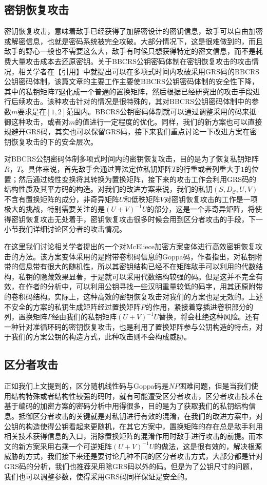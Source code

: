 \subsection{密钥恢复攻击}
密钥恢复攻击，意味着敌手已经获得了加解密设计的密钥信息，敌手可以自由加密或解密信息，也就是密码系统被完全攻破。大部分情况下，这是很难做到的，而且敌手的野心一般也不需要这么大，敌手有时候只想获得特定的密文信息，而不是耗费大量攻击成本去还原密钥。关于BBCRS公钥密码体制在密钥恢复攻击的攻击情况，相关学者在【引用】中就提出可以在多项式时间内攻破采用GRS码的BBCRS公钥密码体制，该篇文章的主要工作主要使BBCRS公钥密码体制的安全性下降，其中的私钥矩阵$T$退化成一个普通的置换矩阵，然后根据已经研究出的攻击手段进行后续攻击。该种攻击针对的情况是很特殊的，其对BBCRS公钥密码体制中的参数$m$要求是在$[1, 2]$范围内。BBCRS公钥密码体制就可以通过调整采用的码来抵御这种攻击，或者对$m$的值进行一定程度的优化。同样，我们的新方案也可以直接规避开GRS码，其实也可以保留GRS码，接下来我们重点讨论一下改进方案在密钥恢复攻击的下的安全层次。

对BBCRS公钥密码体制多项式时间内的密钥恢复攻击，目的是为了恢复私钥矩阵$R$，$T$。具体来说，首先敌手会通过算法定位私钥矩阵$T$的行重或者列重大于$1$的位置；然后通过线性变换将其转换为置换矩阵，接下来的攻击工作会利用GRS码的结构性质及其平方码的构造。对我们的改进方案来说，我们的私钥$(S,D_\mathcal{C},U,V)$不含有置换矩阵的成分，非奇异矩阵$U$和低秩矩阵$V$对密钥恢复攻击的工作是一项极大的挑战，特别需要关注的是$(U+V)^{-1}U$的部分，这是一个非奇异矩阵，将使得密钥恢复攻击无处着手，密钥恢复攻击很多时候会用到区分者攻击的手段，下一小节我们详细讨论区分者的攻击情况。

在这里我们讨论相关学者提出的一个对McEliece加密方案变体进行高效密钥恢复攻击的方法。该方案变体采用的是附带卷积码信息的Goppa码，作者指出，对私钥附带的信息带有很大的随机性，所以其密钥结构已经不在矩阵敌手可以利用的代数结构，私钥的隐藏效果显著，于是就可以采用代数结构较强的码。但是这并不完全有效，在作者的分析中，可以利用公钥寻找一些汉明重量较低的码字，用其还原附带的卷积码结构。实际上，这种高效的密钥恢复攻击对我们的方案也是无效的。上述不安全的方案的私钥生成矩阵经过置换矩阵$P$的作用，紧接着穿插进卷积部分的列，置换矩阵$P$经由我们的私钥矩阵$(U+V)^{-1}U$替换，将会杜绝这种风险。还有一种针对准循环码的密钥恢复攻击，也是利用了置换矩阵参与公钥构造的特点，对于我们的方案公钥的构造方式，此种攻击则不会构成威胁。

\subsection{区分者攻击}
正如我们上文提到的，区分随机线性码与Goppa码是$NP$困难问题，但是当我们使用结构特殊或者结构性较强的码时，就有可能遭受区分者攻击，区分者攻击技术在基于编码的加密方案的密码分析中用得很多，目的是为了获取我们的私钥结构信息。抵御区分者攻击的关键就是对私钥进行有效的混淆，在我们的改进方案中，对公钥的构造使得公钥看起来更随机，在其它方案中，置换矩阵的存在总是敌手利用相关技术获得信息的入口，消除置换矩阵的混淆作用时敌手进行攻击的前提。而本文的新方案采用右乘一个可逆矩阵$(U+V)^{-1}U$的做法，这是很有效的，解决根源威胁的方式，我们接下来还是要讨论几种不同的区分者攻击方式，大部分都是针对GRS码的分析，我们也推荐采用除GRS码以外的码。但是为了公钥尺寸的问题，我们也可以调整参数，使得采用GRS码同样保证是安全的。


